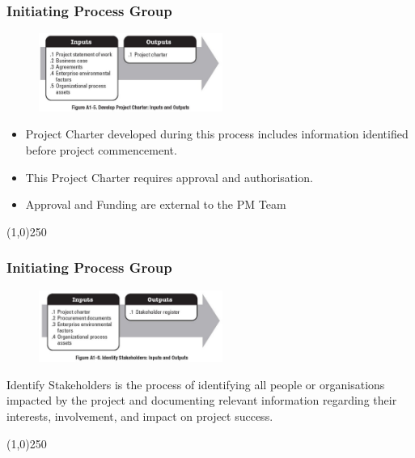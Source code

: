 \begin{frame}
\frametitle{Initiating Process Group}
\begin{figure}
	\centering
		\includegraphics[width = 6cm]{images/FigA1-5.jpg}
	\label{fig:A1-5}
\end{figure} 
\begin{itemize}
	\item Project Charter developed during this process includes information identified before project commencement.
	\item This Project Charter requires approval and authorisation.
	\item Approval and Funding are external to the PM Team
\end{itemize}
\end{frame}
\begin{center}\line(1,0){250}\end{center}



\begin{frame}
\frametitle{Initiating Process Group}
\begin{figure}
	\centering
		\includegraphics[width = 6cm]{images/FigA1-6.jpg}
	\label{fig:A1-6}
\end{figure} 
Identify Stakeholders is the process of identifying all people or organisations impacted by the project and documenting relevant information regarding their interests, involvement, and impact on project success.
\end{frame}
\begin{center}\line(1,0){250}\end{center}



